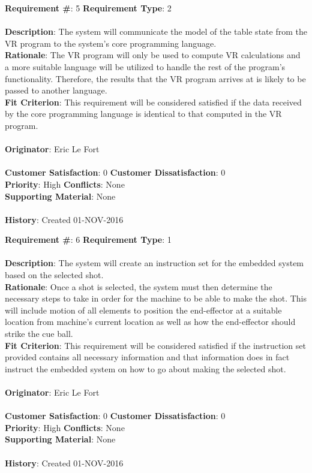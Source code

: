 \documentclass[titlepage]{article}
\begin{document}
\newpage
\begin{framed}
	\noindent\textbf{Requirement \#}: 5 \hfill \textbf{Requirement Type}: 2 \hfill\\\\
	\noindent\textbf{Description}: The system will communicate the model of the table state from the VR program to the system's core programming language.\\
	\textbf{Rationale}: The VR program will only be used to compute VR calculations and a more suitable language will be utilized to handle the rest of the program's functionality. Therefore, the results that the VR program arrives at is likely to be passed to another language.\\
	\textbf{Fit Criterion}: This requirement will be considered satisfied if the data received by the core programming language is identical to that computed in the VR program.\\\\
	\textbf{Originator}: Eric Le Fort\\\\
	\noindent\textbf{Customer Satisfaction}: 0 \hfill 	\textbf{Customer Dissatisfaction}: 0 \hfill\\
	\textbf{Priority}: High \hfill \textbf{Conflicts}: None \hfill\\
	\textbf{Supporting Material}: None\\\\
	\noindent\textbf{History}: Created 01-NOV-2016
\end{framed}

\begin{framed}
	\noindent\textbf{Requirement \#}: 6 \hfill \textbf{Requirement Type}: 1 \hfill\\\\
	\noindent\textbf{Description}: The system will create an instruction set for the embedded system based on the selected shot.\\
	\textbf{Rationale}: Once a shot is selected, the system must then determine the necessary steps to take in order for the machine to be able to make the shot. This will include motion of all elements to position the end-effector at a suitable location from machine's current location as well as how the end-effector should strike the cue ball.\\
	\textbf{Fit Criterion}: This requirement will be considered satisfied if the instruction set provided contains all necessary information and that information does in fact instruct the embedded system on how to go about making the selected shot.\\\\
	\textbf{Originator}: Eric Le Fort\\\\
	\noindent\textbf{Customer Satisfaction}: 0 \hfill 	\textbf{Customer Dissatisfaction}: 0 \hfill\\
	\textbf{Priority}: High \hfill \textbf{Conflicts}: None \hfill\\
	\textbf{Supporting Material}: None\\\\
	\noindent\textbf{History}: Created 01-NOV-2016
\end{framed}
\end{document}
